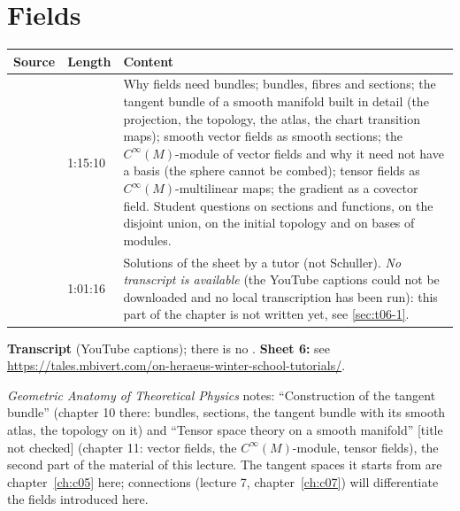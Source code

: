 \chapter{Fields}\label{ch:c06}
\begin{paracol}{2}

\begin{sources}
\begin{tabularx}{\linewidth}{@{}l l L@{}}
\toprule
\textbf{Source} & \textbf{Length} & \textbf{Content}\\
\midrule
{} & 1:15:10 & Why fields need bundles; bundles, fibres and sections; the tangent bundle of a smooth manifold built in detail (the projection, the topology, the atlas, the chart transition maps); smooth vector fields as smooth sections; the $C^\infty(M)$-module of vector fields and why it need not have a basis (the sphere cannot be combed);
tensor fields as $C^\infty(M)$-multilinear maps; the gradient as a covector field. Student questions on sections and functions, on the disjoint union, on the initial topology and on bases of modules.\\
 & 1:01:16 & Solutions of the sheet by a tutor (not Schuller). \emph{No transcript is available} (the YouTube captions could not be downloaded and no local transcription has been run): this part of the chapter is not written yet, see \cref{sec:t06-1}.\\
\bottomrule
\end{tabularx}

\smallskip
\textbf{Transcript}  (YouTube captions); there is no .
\textbf{Sheet 6:} see \url{https://tales.mbivert.com/on-heraeus-winter-school-tutorials/}.
\end{sources}

\begin{reading}
\emph{Geometric Anatomy of Theoretical Physics} notes: ``Construction of the tangent bundle'' (chapter 10 there: bundles, sections, the tangent bundle with its smooth atlas, the topology on it) and ``Tensor space theory on a smooth manifold'' [title not checked] (chapter 11: vector fields, the $C^\infty(M)$-module, tensor fields), the second part
of the material of this lecture. The tangent spaces it starts from are chapter~\ref{ch:c05} here; connections (lecture 7, chapter~\ref{ch:c07}) will differentiate the fields introduced here.
\end{reading}


\end{paracol}
